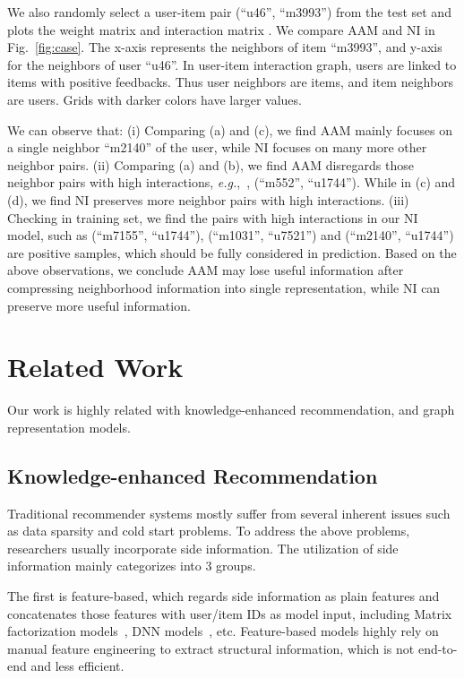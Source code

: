 \documentclass[sigconf]{acmart}
\newcommand{\eg}{\emph{e.g.},~}
\begin{document}
We also randomly select a user-item pair (``u46'', ``m3993'') from the test set and plots the weight matrix  and interaction matrix . We compare AAM and NI in Fig.~\ref{fig:case}. The x-axis represents the neighbors of item ``m3993'', and y-axis for the neighbors of user ``u46''. In user-item interaction graph, users are linked to items with positive feedbacks. Thus user neighbors are items, and item neighbors are users. Grids with darker colors have larger values.

We can observe that:
(i) Comparing (a) and (c), we find AAM mainly focuses on a single neighbor ``m2140'' of the user, while NI focuses on many more other neighbor pairs. 
(ii) Comparing (a) and (b), we find AAM disregards those neighbor pairs with high interactions, \eg, (``m552'', ``u1744''). While in (c) and (d), we find NI preserves more neighbor pairs with high interactions.
(iii) Checking in training set, we find the pairs with high interactions in our NI model, such as (``m7155'', ``u1744''), (``m1031'', ``u7521'') and (``m2140'', ``u1744'') are positive samples, which should be fully considered in prediction. 
Based on the above observations, we conclude AAM may lose useful information after compressing neighborhood information into single representation, while NI can preserve more useful information. 



\section{Related Work} \label{sec:re}
Our work is highly related with knowledge-enhanced recommendation, and graph representation models. 

\subsection{Knowledge-enhanced Recommendation}

Traditional recommender systems 
mostly suffer from several inherent issues such as data sparsity and cold start problems. 
To address the above problems, researchers usually incorporate side information. 
The utilization of side information mainly categorizes into 3 groups.

The first is feature-based, which regards side information as plain features and concatenates those features with user/item IDs as model input, including Matrix factorization models~\cite{koren2008factorization, juan2016field}, DNN models~\cite{qu2016product, guo2017deepfm, qu2018product}, etc. Feature-based models highly rely on manual feature engineering to extract structural information, which is not end-to-end and less efficient. 
\end{document}

